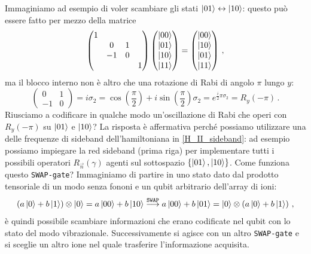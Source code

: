 \noindent Immaginiamo ad esempio di voler scambiare gli stati  $\ket{01} \leftrightarrow \ket{10}$: questo può essere fatto per mezzo della matrice
\begin{equation*}
    \begin{pmatrix}
        1 & & & \\ & 0 & 1 & \\ & -1 & 0 & \\ & & & 1
    \end{pmatrix}
    \begin{pmatrix}
        \ket{00} \\ \ket{01} \\ \ket{10} \\ \ket{11}
    \end{pmatrix}
    = 
    \begin{pmatrix}
        \ket{00} \\ \ket{10} \\ \ket{01} \\ \ket{11}
    \end{pmatrix} \, ,
\end{equation*}
ma il blocco interno non è altro che una rotazione di Rabi di angolo $\pi$ lungo $y$:
\begin{equation*}
    \begin{pmatrix}
        0 & 1 \\ -1 & 0
    \end{pmatrix}
    = i \sigma_2 =
    \cos \! \left( \frac{\pi}{2} \right) + i \sin \! \left( \frac{\pi}{2} \right) \sigma_2 = e^{\frac{i}{2} \pi \sigma_2} = R_y(-\pi) \, .
\end{equation*}
Riusciamo a codificare in qualche modo un'oscillazione di Rabi che operi con $R_y(-\pi)$ su $\ket{01}$ e $\ket{10}$? La risposta è affermativa perché possiamo utilizzare una delle frequenze di sideband dell'hamiltoniana in  \eqref{H_II_sideband}: ad esempio possiamo impiegare la red sideband (prima riga) per implementare tutti i possibili operatori $R_{\vec{n}}(\gamma)$ agenti sul sottospazio $\{ \ket{01}, \ket{10} \}$. Come funziona questo \texttt{SWAP-gate}? Immaginiamo di partire in uno stato dato dal prodotto tensoriale di un modo senza fononi e un qubit arbitrario dell'array di ioni: 
\begin{equation*}
    \left( a \ket{0} + b \ket{1} \right) \otimes \ket{0} = a \ket{00} + b \ket{10} \overset{\texttt{SWAP}}{\longrightarrow} a \ket{00} + b \ket{01} = \ket{0} \otimes \left( a \ket{0} + b \ket{1} \right) \, ,
\end{equation*}
è quindi possibile scambiare informazioni che erano codificate nel qubit con lo stato del modo vibrazionale. Successivamente si agisce con un altro \texttt{SWAP-gate} e si sceglie un altro ione nel quale trasferire l'informazione acquisita. 

